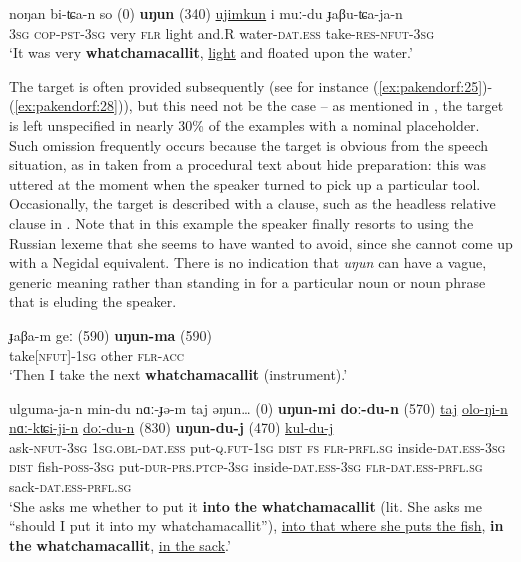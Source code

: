 \documentclass[output=paper]{langscibook}
\begin{document}
\ea \label{ex:pakendorf:28}
\gll noŋan
	bi-ʨa-n
	so
	\textup{(0)}
	\textbf{uŋun}
	\textup{(340)}
	\uline{ujimkun}
	i
	muː-du
	ɟaβu-ʨa-ja-n\\
     \textsc{3sg}
     \textsc{cop-pst-3sg}
     very
     {}
     \textsc{flr}
     {}
     light
     and.R
     water-\textsc{dat.ess}
     take-\textsc{res-nfut-3sg}\\
\glt ‘It was very \textbf{whatchamacallit}, \uline{light} and floated upon the water.’ 
\z

The target is often provided subsequently (see for instance (\ref{ex:pakendorf:25})-(\ref{ex:pakendorf:28})), but this need not be the case – as mentioned in , the target is left unspecified in nearly 30\% of the examples with a nominal placeholder. Such omission frequently occurs because the target is obvious from the speech situation, as in  taken from a procedural text about hide preparation: this was uttered at the moment when the speaker turned to pick up a particular tool. Occasionally, the target is described with a clause, such as the headless relative clause in . Note that in this example the speaker finally resorts to using the Russian lexeme that she seems to have wanted to avoid, since she cannot come up with a Negidal equivalent. There is no indication that \textit{uŋun} can have a vague, generic meaning rather than standing in for a particular noun or noun phrase that is eluding the speaker.


\ea \label{ex:pakendorf:29}
\gll ɟaβa-m
	geː
	\textup{(590)}
	\textbf{uŋun-ma}
	\textup{(590)}\\
     take[\textsc{nfut]-1sg}
     other
     {}
     \textsc{flr-acc}
     {}\\
\glt ‘Then I take the next \textbf{whatchamacallit} (instrument).’ 
\z

\ea \label{ex:pakendorf:30}
\gll
	ulguma-ja-n
	min-du
	nɑː-ɟə-m
	taj
	əŋun…
	\textup{(0)}
	\textbf{uŋun-mi}
	\textbf{doː-du-n}
	\textup{(570)}
	\uline{taj}
	\uline{olo-ŋi-n}
	\uline{nɑː-kʨi-ji-n}
	\uline{doː-du-n}
	\textup{(830)}
	\textbf{uŋun-du-j}
	\textup{(470)}
	\uline{kul-du-j}\\
     ask-\textsc{nfut-3sg} \textsc{1sg.obl-dat.ess} put-\textsc{q.fut-1sg} \textsc{dist} \textsc{fs} {} \textsc{flr-prfl.sg} inside-\textsc{dat.ess-3sg} {} \textsc{dist} fish-\textsc{poss-3sg} put-\textsc{dur}-\textsc{prs.ptcp-3sg} inside-\textsc{dat.ess-3sg} {} \textsc{flr-dat.ess-prfl.sg} {} sack\textsc{{}-dat.ess-prfl.sg}\\
\glt ‘She asks me whether to put it \textbf{into} \textbf{the} \textbf{whatchamacallit} (lit. She asks me “should I put it into my whatchamacallit”), \uline{into that where she puts the fish}, \textbf{in} \textbf{the} \textbf{whatchamacallit}, \uline{in the sack}.’ 
\z
\end{document}
